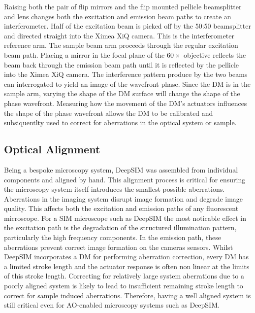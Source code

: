 Raising both the  pair of flip mirrors and the  flip mounted pellicle beamsplitter and lens changes both the excitation and emission beam paths to create an interferometer. Half of the excitation beam is picked off by the 50:50 beamsplitter and directed straight into the Ximea XiQ camera. This is the interferometer reference arm. The sample beam arm proceeds through the regular excitation beam path. Placing a mirror in the focal plane of the $60\times$ objective reflects the beam back through the emission beam path until it is reflected by the pellicle into the Ximea XiQ camera. The interference pattern produce by the two beams can interrogated to yield an image of the wavefront phase. Since the DM is in the sample arm, varying the shape of the DM surface will change the shape of the phase wavefront. Measuring how the movement of the DM's actuators influences the shape of the phase wavefront allows the DM to be calibrated and subsiquentlty used to correct for aberrations in the optical system or sample. 

\subsection{Optical Alignment}
\label{subsec:alignment}

Being a bespoke microscopy system, DeepSIM was assembled from individual components and aligned by hand. This alignment process is critical for ensuring the microscopy system itself introduces the smallest possible aberrations. Aberrations in the imaging system disrupt image formation and degrade image quality.\cite{wyant1992basic} This affects both the excitation and emission paths of any fluorescent microscope. For a SIM microscope such as DeepSIM the most noticable effect in the excitation path is the degradation of the structured illumination pattern, particularly the high frequency components.\cite{debarre2008adaptive,booth2015aberrations} In the emission path, these aberrations prevent correct image formation on the cameras sensors. Whilst DeepSIM incorporates a DM for performing aberration correction, every DM has a limited stroke length and the actuator response is often non linear at the limits of this stroke length. Correcting for relatively large system aberrations due to a poorly aligned system is likely to lead to insufficient remaining stroke length to correct for sample induced aberrations. Therefore, having a well aligned system is still critical even for AO-enabled microscopy systems such as DeepSIM.

